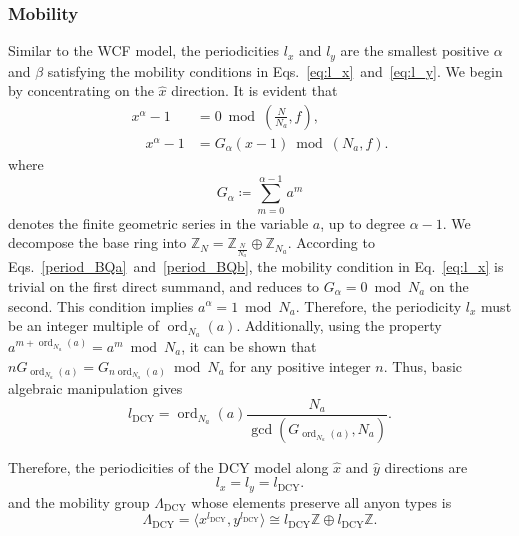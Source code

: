 \documentclass[aps,prb,english,superscriptaddress,twocolumn,tightenlines,showpacs,longbibliography,floatfix,amsfonts]{revtex4-2}
\newcommand{\ord}{\operatorname{ord}}
\begin{document}
\subsubsection{Mobility}

Similar to the WCF model, the periodicities $l_x$ and $l_y$ are the smallest positive $\alpha$ and $\beta$ satisfying the mobility conditions in Eqs.~\eqref{eq:l_x}~and~\eqref{eq:l_y}. We begin by concentrating on the $\hat{x}$ direction. It is evident that
\begin{subequations}
\begin{align}
    x^{\alpha}-1&=0\bmod \left(\frac{N}{N_a},f\right),\label{period_BQa}\\
    \quad x^{\alpha}-1&= G_{\alpha}(x-1) \bmod (N_a,f).\label{period_BQb}
\end{align}
\end{subequations}
where 
\begin{equation}
G_{\alpha}\coloneqq\sum_{m=0}^{\alpha-1}a^m  
\end{equation}
denotes the finite geometric series in the variable $a$, up to degree $\alpha-1$. We decompose the base ring into $\mathbb{Z}_N=\mathbb{Z}_{\frac{N}{N_a}}\oplus\mathbb{Z}_{N_a}$. According to Eqs.~\eqref{period_BQa}~and~\eqref{period_BQb}, the mobility condition in Eq.~\eqref{eq:l_x} is trivial on the first direct summand, and reduces to $G_{\alpha}=0\bmod N_a$ on the second. This condition implies $a^{\alpha}=1\bmod N_a$. Therefore, the periodicity $l_x$ must be an integer multiple of $\ord_{N_a}(a)$. Additionally, using the property $a^{m+\ord_{N_a}(a)}=a^m\bmod N_a$, it can be shown that $nG_{\ord_{N_a}(a)}=G_{n\ord_{N_a}(a)}\bmod N_a$ for any positive integer $n$. Thus, basic algebraic manipulation gives
\begin{equation}
    l_{\operatorname{DCY}}=\ord_{N_a}\left(a\right)\frac{N_a}{\gcd(G_{\ord_{N_a}(a)},N_a)}.
\end{equation}
  
Therefore, the periodicities of the DCY model along $\hat{x}$ and $\hat{y}$ directions are 
\begin{equation}
    l_x=l_y=l_{\operatorname{DCY}}.
\end{equation}
and the mobility group $\Lambda_{{\operatorname{DCY}}}$ whose elements preserve all anyon types is
\begin{equation}
    \Lambda_{{\operatorname{DCY}}}=\langle x^{l_{\operatorname{DCY}}},y^{l_{\operatorname{DCY}}}\rangle\cong l_{\operatorname{DCY}}\mathbb{Z}\oplus l_{\operatorname{DCY}}\mathbb{Z}.
\end{equation}
\end{document}
